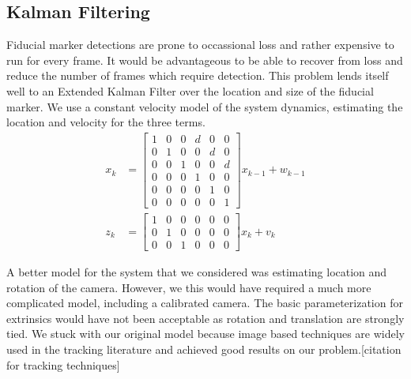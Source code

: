 \documentclass[12pt]{article}
\begin{document}
\subsection{Kalman Filtering}
Fiducial marker detections are prone to occassional loss and rather expensive to run for every frame.  It would be advantageous to be able to recover from loss and reduce the number of frames which require detection.  This problem lends itself well to an Extended Kalman Filter over the location and size of the fiducial marker.  We use a constant velocity model of the system dynamics, estimating the location and velocity for the three terms.  
\begin{align}
x_k &= \left[ \begin{array}{cccccc} 
1 & 0 & 0 & d & 0 & 0 \\
0 & 1 & 0 & 0 & d & 0 \\
0 & 0 & 1 & 0 & 0 & d \\
0 & 0 & 0 & 1 & 0 & 0\\
0 & 0 & 0 & 0 & 1 & 0\\
0 & 0 & 0 & 0 & 0 & 1
\end{array}\right] x_{k-1} + w_{k-1}\\
z_k &= \left[ \begin{array}{cccccc}
1 & 0 & 0 & 0 & 0 & 0\\
0 & 1 & 0 & 0 & 0 & 0\\
0 & 0 & 1 & 0 & 0 & 0\end{array}\right] x_k + v_{k}
\end{align}

A better model for the system that we considered was estimating location and rotation of the camera.  However, we this would have required a much more complicated model, including a calibrated camera.  The basic parameterization for extrinsics would have not been acceptable as rotation and translation are strongly tied.  We stuck with our original model because image based techniques are widely used in the tracking literature and achieved good results on our problem.[citation for tracking techniques]
\end{document}
